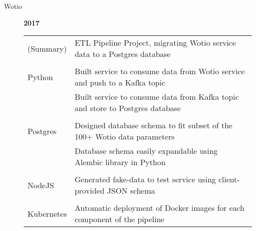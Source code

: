 \documentclass[12pt]{article}
\begin{document}
\begin{description}
\begin{description}
                \item[Wotio] \hfill \textbf{2017}\\
                    \begin{tabular}{l|l}
                        (Summary) & ETL Pipeline Project, migrating Wotio service data to a Postgres database\\
				\\[-1.7mm]
                        Python    & Built service to consume data from Wotio service and push to a Kafka topic\\
                                  & Built service to consume data from Kafka topic and store to Postgres database\\
				\\[-1.7mm]
                        Postgres  & Designed database schema to fit subset of the 100+ Wotio data parameters\\
				  & Database schema easily expandable using Alembic library in Python\\
				\\[-1.7mm]
                        NodeJS    & Generated fake-data to test service using client-provided JSON schema\\
				\\[-1.7mm]
                        Kubernetes& Automatic deployment of Docker images for each component of the pipeline\\
                    \end{tabular}


\end{description}
\end{description}
\end{document}
